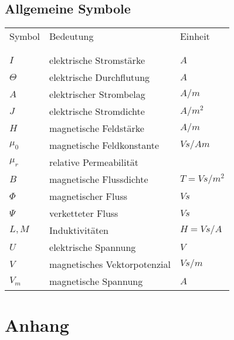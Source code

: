 \section*{Allgemeine Symbole}\label{s.sym.alg}
\begin{flushleft}\begin{tabularx}{\textwidth}{l l X}
Symbol & Bedeutung	& Einheit\\
\\
\hline
\\ 
$I$	& elektrische Stromstärke	&	$A$ \\
$\Theta$	&	elektrische Durchflutung 	&	$A$	\\
$A$			&	elektrischer Strombelag  	&  	$A/m$\\ 
$J$			&	elektrische Stromdichte		&	$A/m^2$ \\	
$H$			&	magnetische Feldstärke		&	$A/m$\\
$\mu_0$		&	magnetische Feldkonstante	&	$Vs/Am$\\
$\mu_r$		&	relative Permeabilität		&	\\
$B$			&	magnetische Flussdichte		&	$T = Vs/m^2$ \\
$\Phi$		&	magnetischer Fluss			&	$Vs$ \\
$\Psi$		&	verketteter Fluss			&	$Vs$ \\
$L, M$		&	Induktivitäten				&	$H = Vs/A$\\
$U$			&	elektrische Spannung		&	$V$ \\
$V$			&	magnetisches Vektorpotenzial&	$Vs/m$\\
$V_m$		&	magnetische Spannung		&	$A$
\end{tabularx}\end{flushleft}
%
\cleardoublepage

%
%
%
%
%
\cleardoublepage
\nocite{*}
\printbibliography
\appendix
\chapter{Anhang}



